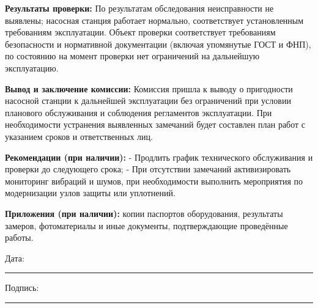 \documentclass[12pt]{article}
\begin{document}
\textbf{Результаты проверки:} По результатам обследования неисправности не выявлены; насосная станция работает нормально, соответствует установленным требованиям эксплуатации. Объект проверки соответствует требованиям безопасности и нормативной документации (включая упомянутые ГОСТ и ФНП), по состоянию на момент проверки нет ограничений на дальнейшую эксплуатацию.

\textbf{Вывод и заключение комиссии:} Комиссия пришла к выводу о пригодности насосной станции к дальнейшей эксплуатации без ограничений при условии планового обслуживания и соблюдения регламентов эксплуатации. При необходимости устранения выявленных замечаний будет составлен план работ с указанием сроков и ответственных лиц.

\textbf{Рекомендации (при наличии):} 
- Продлить график технического обслуживания и проверки до следующего срока; 
- При отсутствии замечаний активизировать мониторинг вибраций и шумов, при необходимости выполнить мероприятия по модернизации узлов защиты или уплотнений.

\textbf{Приложения (при наличии):} копии паспортов оборудования, результаты замеров, фотоматериалы и иные документы, подтверждающие проведённые работы.

\vfill

\noindent
Дата: \rule{5cm}{0.4pt} \hfill Подпись: \rule{5cm}{0.4pt}
\end{document}
